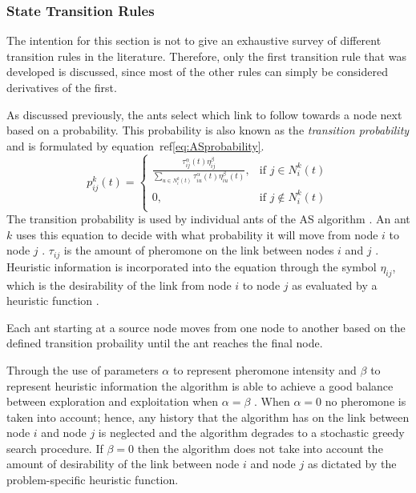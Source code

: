 \subsubsection{State Transition Rules}
\label{sec:STR}
The intention for this section is not to give an exhaustive survey of different transition rules in the literature. Therefore, only the first transition rule that was developed is discussed, since most of the other rules can simply be considered derivatives of the first. 

 As discussed previously, the ants select which link to follow towards a node next based on a probability. This probability is also known as the \emph{transition probability} and is formulated by equation~ref\ref{eq:ASprobability}.
\begin{equation}
\label{eq:ASprobability}
p^k_{ij}(t) =
\begin{cases}
	\frac{\tau^{\alpha}_{ij}(t)\eta^{\beta}_{ij}}{\sum_{u \in N^k_i(t)} {\tau^{\alpha}_{iu}(t)\eta^{\beta}_{iu}(t)}}, &\text{if $j \in N^k_i(t)$}\\
	0, &\text{if $j \notin N^k_i(t)$}\\
\end{cases}
\end{equation}
The transition probability is used by individual ants of the \gls{AS} algorithm \cite{CompuIntelligenceIntro,AntSurvey,ACOLargeProblem,AntQAP,FundamentalSwarm}. An ant $k$ uses this equation to decide with what probability it will move from node $i$ to node $j$ \cite{CompuIntelligenceIntro,ACOLargeProblem,AntQAP,FundamentalSwarm}. $\tau_{ij}$ is the amount of pheromone on the link between nodes $i$ and $j$ \cite{CompuIntelligenceIntro,AntsAndStigmergy,ACOLargeProblem,AntQAP,FundamentalSwarm}. Heuristic information is incorporated into the equation through the symbol $\eta_{ij}$, which is the desirability of the link from node $i$ to node $j$ as evaluated by a heuristic function \cite{CompuIntelligenceIntro,AntsAndStigmergy,ACOLargeProblem,AntQAP,FundamentalSwarm}. 

Each ant starting at a source node moves from one node to another based on the defined transition probaility until the ant reaches the final node.

Through the use of parameters $\alpha$ to represent pheromone intensity and $\beta$ to represent heuristic information the algorithm is able to achieve a good balance between exploration and exploitation when $\alpha=\beta$ \cite{CompuIntelligenceIntro,ACOLargeProblem,AntQAP,FundamentalSwarm}. When $\alpha = 0$ no pheromone is taken into account; hence, any history that the algorithm has on the link between node $i$ and node $j$ is neglected and the algorithm degrades to a stochastic greedy search procedure. If $\beta = 0$ then the algorithm does not take into account the amount of desirability of the link between node $i$ and node $j$ as dictated by the problem-specific heuristic function.

